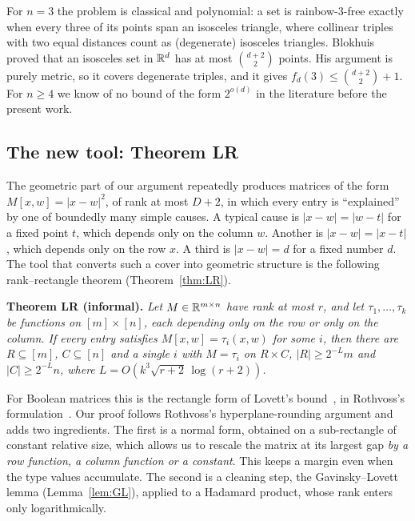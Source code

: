 For $n=3$ the problem is classical and polynomial: a set is rainbow-$3$-free exactly when every three of its
points span an isosceles triangle, where collinear triples with two equal distances count as (degenerate)
isosceles triangles. Blokhuis~\cite{Blokhuis} proved that an isosceles set in $\mathbb{R}^d$ has at most
$\binom{d+2}{2}$ points. His argument is purely metric, so it covers degenerate triples, and it gives
$f_d(3)\le\binom{d+2}2+1$. For $n\ge 4$ we know of no bound of the form $2^{o(d)}$ in the
literature before the present work.

\subsection{The new tool: Theorem LR}
The geometric part of our argument repeatedly produces matrices of the form $M[x,w]=|x-w|^2$, of rank at most
$D+2$, in which every entry is ``explained'' by one of boundedly many simple causes. A typical cause is
$|x-w|=|w-t|$ for a fixed point $t$, which depends only on the column $w$. Another is $|x-w|=|x-t|$, which
depends only on the row $x$. A third is $|x-w|=d$ for a fixed number $d$. The tool that converts such a cover
into geometric structure is the following rank--rectangle theorem (Theorem~\ref{thm:LR}).

\medskip\noindent\textbf{Theorem LR (informal).} \emph{Let $M\in\mathbb{R}^{m\times n}$ have rank at most $r$, and let
$\tau_1,\dots,\tau_k$ be functions on $[m]\times[n]$, each depending only on the row or only on the column. If every
entry satisfies $M[x,w]=\tau_i(x,w)$ for some $i$, then there are $R\subseteq[m]$, $C\subseteq[n]$ and a single
$i$ with $M=\tau_i$ on $R\times C$, $|R|\ge 2^{-L}m$ and $|C|\ge 2^{-L}n$, where
$L=O(k^3\sqrt{r+2}\,\log(r+2))$.}

\medskip
For Boolean matrices this is the rectangle form of Lovett's bound~\cite{Lovett}, in Rothvoss's
formulation~\cite{Rothvoss}. Our proof follows Rothvoss's hyperplane-rounding argument and adds two ingredients.
The first is a normal form, obtained on a sub-rectangle of constant relative size, which allows us to rescale the
matrix at its largest gap \emph{by a row function, a column function or a constant}. This keeps a margin even
when the type values accumulate. The second is a cleaning step, the Gavinsky--Lovett lemma (Lemma~\ref{lem:GL}),
applied to a Hadamard product, whose rank enters only logarithmically.

